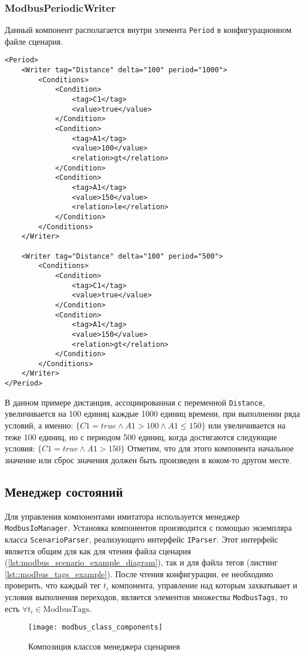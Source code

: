 \subsubsection{ModbusPeriodicWriter}
Данный компонент располагается внутри элемента \texttt{Period} в конфигурационном файле сценария.
\begin{lstlisting}[language=MyXML]
<Period>
    <Writer tag="Distance" delta="100" period="1000">
        <Conditions>
            <Condition>
                <tag>C1</tag>
                <value>true</value>
            </Condition>
            <Condition>
                <tag>A1</tag>
                <value>100</value>
                <relation>gt</relation>
            </Condition>
            <Condition>
                <tag>A1</tag>
                <value>150</value>
                <relation>le</relation>
            </Condition>
        </Conditions>
    </Writer>

    <Writer tag="Distance" delta="100" period="500">
        <Conditions>
            <Condition>
                <tag>C1</tag>
                <value>true</value>
            </Condition>
            <Condition>
                <tag>A1</tag>
                <value>150</value>
                <relation>gt</relation>
            </Condition>
        </Conditions>
    </Writer>
</Period>
\end{lstlisting}
В данном примере дистанция, ассоциированная с переменной \texttt{Distance}, увеличивается на 100 единиц каждые 1000 единиц времени,
при выполнении ряда условий, а именно: $\{C1 = true \wedge A1 > 100 \wedge A1 \le 150 \}$ или
увеличивается на теже 100 единиц, но с периодом 500 единиц, когда достигаются следующие условия:
$\{C1 = true \wedge A1 > 150\}$
Отметим, что для этого компонента начальное значение или сброс значения должен быть произведен в коком-то
другом месте.



\subsection{Менеджер состояний}
Для управления компонентами имитатора используется менеджер \texttt{ModbusIoManager}. Установка компонентов производится с помощью экземпляра класса \texttt{ScenarioParser}, реализующего интерфейс \texttt{IParser}.
Этот интерфейс является общим для как для чтения файла сценария (\ref{lst:modbus_scenario_example_diagram}),
так и для файла тегов (листинг \ref{lst::modbus_tags_example}).
После чтения конфигурации, ее необходимо проверить, что каждый тег $t_i$
компонента, управление над которым захватывает и условия выполнения переходов, является элементов множества \texttt{ModbusTags},
то есть $\forall t_i \in \mbox{ModbusTags}$.
\begin{center}
    \begin{figure}
        \texttt{[image: modbus\_class\_components]}
        \caption{Композиция классов менеджера сценариев}\label{fig:modbus_class_components}
    \end{figure}
\end{center}


